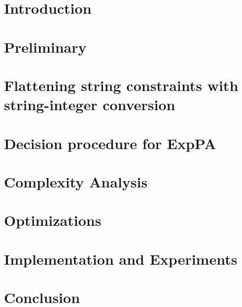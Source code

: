 \documentclass[sn-mathphys]{sn-jnl}%
\theoremstyle{thmstyleone}%
\theoremstyle{thmstyletwo}%
\theoremstyle{thmstylethree}%
\newcommand{\paexp}{{\sf ExpPA}}
\begin{document}
\section{Introduction}\label{sec:intro}


\section{Preliminary}\label{sec:pre}


\section{Flattening string constraints with string-integer conversion}\label{sec:string-solving}


\section{Decision procedure for {\paexp}}\label{sec-dec}


\section{Complexity Analysis}\label{sec-cpx}


\section{Optimizations}\label{sec-opt}


\section{Implementation and Experiments}\label{sec-exp}


\section{Conclusion}

\end{document}
